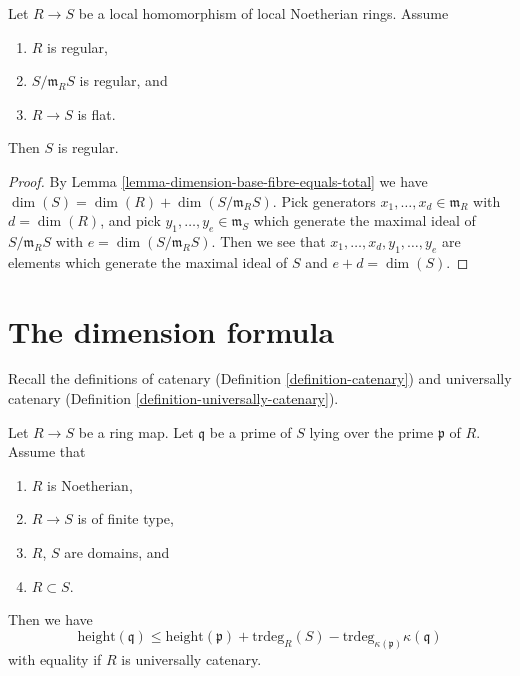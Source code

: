 \begin{lemma}
\label{lemma-flat-over-regular-with-regular-fibre}
Let $R \to S$ be a local homomorphism of local Noetherian rings.
Assume
\begin{enumerate}
\item $R$ is regular,
\item $S/\mathfrak m_RS$ is regular, and
\item $R \to S$ is flat.
\end{enumerate}
Then $S$ is regular.
\end{lemma}

\begin{proof}
By Lemma \ref{lemma-dimension-base-fibre-equals-total}
we have
$\dim(S) = \dim(R) + \dim(S/\mathfrak m_RS)$.
Pick generators $x_1, \ldots, x_d \in \mathfrak m_R$ with $d = \dim(R)$,
and pick $y_1, \ldots, y_e \in \mathfrak m_S$
which generate the maximal ideal of $S/\mathfrak m_RS$ with
$e = \dim(S/\mathfrak m_RS)$. Then we see that
$x_1, \ldots, x_d, y_1, \ldots, y_e$ are elements which generate
the maximal ideal of $S$ and $e + d = \dim(S)$.
\end{proof}









\section{The dimension formula}
\label{section-dimension-formula}

\noindent
Recall the definitions of catenary (Definition \ref{definition-catenary})
and universally catenary (Definition \ref{definition-universally-catenary}).

\begin{lemma}
\label{lemma-dimension-formula}
Let $R \to S$ be a ring map.
Let $\mathfrak q$ be a prime of $S$ lying over the prime $\mathfrak p$ of $R$.
Assume that
\begin{enumerate}
\item $R$ is Noetherian,
\item $R \to S$ is of finite type,
\item $R$, $S$ are domains, and
\item $R \subset S$.
\end{enumerate}
Then we have
$$
\text{height}(\mathfrak q)
\leq
\text{height}(\mathfrak p) + \text{trdeg}_{R}(S)
- \text{trdeg}_{\kappa(\mathfrak p)} \kappa(\mathfrak q)
$$
with equality if $R$ is universally catenary.
\end{lemma}

